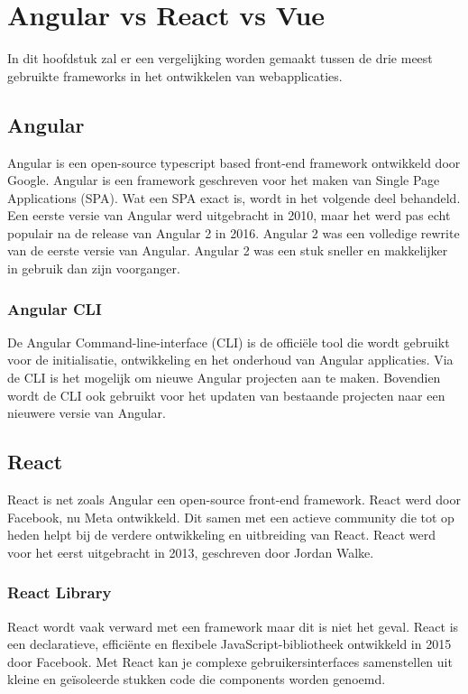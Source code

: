 \section{Angular vs React vs Vue}%
In dit hoofdstuk zal er een vergelijking worden gemaakt tussen de drie meest
gebruikte frameworks in het ontwikkelen van webapplicaties.

\subsection*{Angular}%
Angular is een open-source typescript based front-end framework ontwikkeld door
Google. Angular is een framework geschreven voor het maken van Single Page
Applications (SPA). Wat een SPA exact is, wordt in het volgende deel behandeld.
\bigbreak Een eerste versie van Angular werd uitgebracht in 2010, maar het werd
pas echt populair na de release van Angular 2 in 2016. Angular 2 was een
volledige rewrite van de eerste versie van Angular. Angular 2 was een stuk
sneller en makkelijker in gebruik dan zijn voorganger. \autocite{DeNeve2021}

\subsubsection{Angular CLI}
De Angular Command-line-interface (CLI) is de officiële tool die wordt gebruikt
voor de initialisatie, ontwikkeling en het onderhoud van Angular applicaties.
Via de CLI is het mogelijk om nieuwe Angular projecten aan te maken. Bovendien
wordt de CLI ook gebruikt voor het updaten van bestaande projecten naar een
nieuwere versie van Angular.

\subsection*{React}%
React is net zoals Angular een open-source \textcite{React2024} front-end
framework. React werd door Facebook, nu Meta ontwikkeld. Dit samen met een
actieve community die tot op heden helpt bij de verdere ontwikkeling en
uitbreiding van React. React werd voor het eerst uitgebracht in 2013,
geschreven door Jordan Walke.

\subsubsection*{React Library}%
React wordt vaak verward met een framework maar dit is niet het geval. \autocite{Vallaey2021} React is een declaratieve, efficiënte en flexibele JavaScript-bibliotheek ontwikkeld in 2015 door Facebook. Met React kan je complexe ge\-bruik\-er\-sin\-ter\-fa\-ces samen\-stellen uit kleine en ge\-ïso\-leerde stuk\-ken code die comp\-onents worden genoemd.

